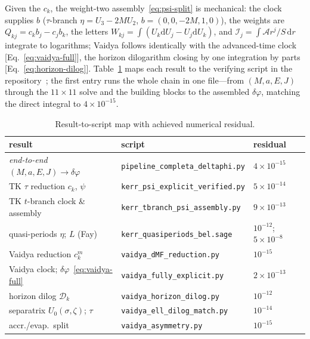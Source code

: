 \documentclass[
    aps, prd, twocolumn, superscriptaddress,
    showpacs, nofootinbib, floatfix
]{revtex4-2}
\newcommand{\dd}{\mathrm{d}}
\begin{document}
Given the $c_k$, the weight-two assembly~\eqref{eq:psi-split} is mechanical: the
clock supplies $b$ ($\tau$-branch $\eta=U_3-2M U_2$, $b=(0,0,-2M,1,0)$), the weights
are $Q_{kj}=c_kb_j-c_jb_k$, the letters $W_{kj}=\int(U_k\dd U_j-U_j\dd U_k)$, and
$\mathcal{I}_j=\int\mathcal{A}r^j/S\,\dd r$ integrate to logarithms; Vaidya follows
identically with the advanced-time clock [Eq.~\eqref{eq:vaidya-full}], the horizon
dilogarithm closing by one integration by parts [Eq.~\eqref{eq:horizon-dilog}].
Table~\ref{tab:script-map} maps each result to the verifying script in the
repository~\cite{Rosignoli2026Code}; the first entry runs the whole chain in one
file---from $(M,a,E,J)$ through the $11\times11$ solve and the building blocks to the
assembled $\delta\varphi$, matching the direct integral to $4\times10^{-15}$.
\begin{table}[t]
    \centering
    \caption{Result-to-script map with achieved numerical residual.}
    \label{tab:script-map}
    \begin{ruledtabular}
    \begin{tabular}{lll}
        result & script & residual\\
        \hline
        \emph{end-to-end} $(M,a,E,J)\!\to\!\delta\varphi$ & \texttt{pipeline\_completa\_deltaphi.py} & $4{\times}10^{-15}$\\
        TK $\tau$ reduction $c_k$, $\psi$ & \texttt{kerr\_psi\_explicit\_verified.py} & $5{\times}10^{-14}$\\
        TK $t$-branch clock \& assembly & \texttt{kerr\_tbranch\_psi\_assembly.py} & $9{\times}10^{-13}$\\
        quasi-periods $\eta$; $L$ (Fay) & \texttt{kerr\_quasiperiods\_bel.sage} & $10^{-12}$; $5{\times}10^{-8}$\\
        Vaidya reduction $c_k^m$ & \texttt{vaidya\_dMF\_reduction.py} & $10^{-15}$\\
        Vaidya clock; $\delta\varphi$~\eqref{eq:vaidya-full} & \texttt{vaidya\_fully\_explicit.py} & $2{\times}10^{-13}$\\
        horizon dilog $\mathcal{D}_k$ & \texttt{vaidya\_horizon\_dilog.py} & $10^{-12}$\\
        separatrix $U_0(\sigma,\zeta)$; $\tau$ & \texttt{vaidya\_ell\_dilog\_match.py} & $10^{-14}$\\
        accr./evap.\ split & \texttt{vaidya\_asymmetry.py} & $10^{-15}$\\
    \end{tabular}
    \end{ruledtabular}
\end{table}
\end{document}
